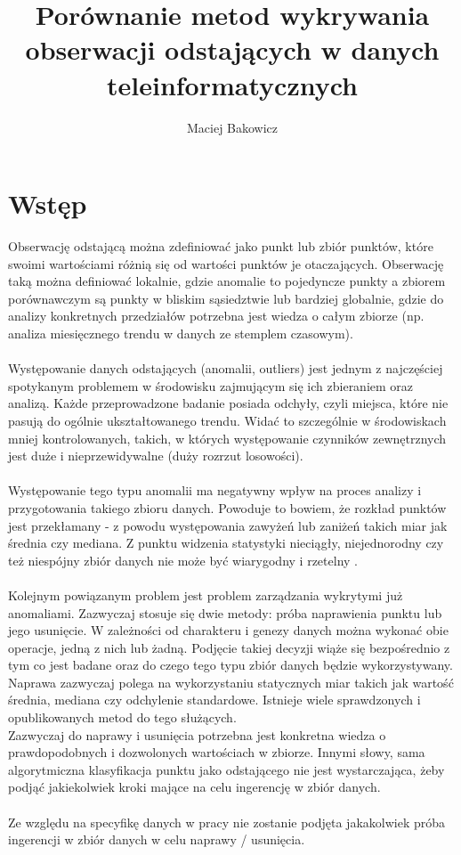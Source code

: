 \documentclass[eng,printmode]{mgr}
\title{Porównanie metod wykrywania obserwacji odstających w danych teleinformatycznych}
\author{Maciej Bakowicz}
\begin{document}

\maketitle 

\tableofcontents 

\chapter{Wstęp}  
Obserwację odstającą można zdefiniować jako punkt lub zbiór punktów, które swoimi wartościami różnią się od wartości punktów je otaczających. Obserwację taką można definiować lokalnie, gdzie anomalie to pojedyncze punkty a zbiorem porównawczym są punkty w bliskim sąsiedztwie lub bardziej globalnie, gdzie do analizy konkretnych przedziałów potrzebna jest wiedza o całym zbiorze (np. analiza miesięcznego trendu w danych ze stemplem czasowym). 
\\ \\
Występowanie danych odstających (anomalii, outliers) jest jednym z najczęściej spotykanym problemem w środowisku zajmującym się ich zbieraniem oraz analizą. Każde przeprowadzone badanie posiada odchyły, czyli miejsca, które nie pasują do ogólnie ukształtowanego trendu. Widać to szczególnie w środowiskach mniej kontrolowanych, takich, w których występowanie czynników zewnętrznych jest duże i nieprzewidywalne (duży rozrzut losowości). 
\\\\
Występowanie tego typu anomalii ma negatywny wpływ na proces analizy i przygotowania takiego zbioru danych. Powoduje to bowiem, że rozkład punktów jest przekłamany - z powodu występowania zawyżeń lub zaniżeń takich miar jak średnia czy mediana. Z punktu widzenia statystyki nieciągły, niejednorodny czy też niespójny zbiór danych nie może być wiarygodny i rzetelny \cite{outliers-impact}.
\\ \\
Kolejnym powiązanym problem jest problem zarządzania wykrytymi już anomaliami. Zazwyczaj stosuje się dwie metody: próba naprawienia punktu lub jego usunięcie. W zależności od charakteru i genezy danych można wykonać obie operacje, jedną z nich lub żadną. Podjęcie takiej decyzji wiąże się bezpośrednio z tym co jest badane oraz do czego tego typu zbiór danych będzie wykorzystywany. \\
Naprawa zazwyczaj polega na wykorzystaniu statycznych miar takich jak wartość średnia, mediana czy odchylenie standardowe. Istnieje wiele sprawdzonych i opublikowanych metod do tego służących. \\
Zazwyczaj do naprawy i usunięcia potrzebna jest konkretna wiedza o prawdopodobnych i dozwolonych wartościach w zbiorze. Innymi słowy, sama algorytmiczna klasyfikacja punktu jako odstającego nie jest wystarczająca, żeby podjąć jakiekolwiek kroki mające na celu ingerencję w zbiór danych. 
\\ \\ 
Ze względu na specyfikę danych w pracy nie zostanie podjęta jakakolwiek próba ingerencji w zbiór danych w celu naprawy / usunięcia.
\end{document}
